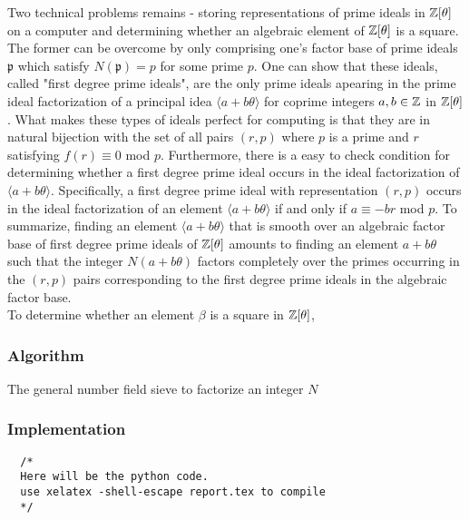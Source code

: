     Two technical problems remains - storing representations of prime ideals in $\mathbb{Z}[\theta]$ on a computer and determining whether an algebraic element of $\mathbb{Z}[\theta]$ is a square. \\ 

    The former can be overcome by only comprising one's factor base of prime ideals $\mathfrak{p}$ which satisfy $N(\mathfrak{p})=p$ for some prime $p$. One can show that these ideals, called "first degree prime ideals", are the only prime ideals apearing in the prime ideal factorization of a principal idea $\langle a + b \theta \rangle $ for coprime integers $a,b\in \mathbb{Z}$ in $\mathbb{Z}[\theta]$. What makes these types of ideals perfect for computing is that they are in natural bijection with the set of all pairs $(r,p)$ where $p$ is a prime and $r$ satisfying $f(r) \equiv 0$ mod $p$. Furthermore, there is a easy to check condition for determining whether a first degree prime ideal occurs in the ideal factorization of $\langle a + b \theta \rangle $. Specifically, a first degree prime ideal with representation $(r,p)$ occurs in the ideal factorization of an element $\langle a + b \theta \rangle $ if and only if $a \equiv -br $ mod $p$. To summarize, finding an element $\langle a + b \theta \rangle $ that is smooth over an algebraic factor base of first degree prime ideals of $\mathbb{Z}[\theta]$ amounts to finding an element $a + b \theta $ such that the integer $N(a + b \theta)$ factors completely over the primes occurring in the $(r,p)$ pairs corresponding to the first degree prime ideals in the algebraic factor base. \\

    To determine whether an element $\beta$ is a square in $\mathbb{Z}[\theta]$, 


\subsubsection{Algorithm} \label{algo}

 
\begin{algorithm} 
  \caption{The general number field sieve to factorize an integer $N$}
  \begin{algorithmic}[1]
    \State {}
  \end{algorithmic} 
\end{algorithm} 

\subsubsection{Implementation}


\begin{verbatim}
  /*
  Here will be the python code.
  use xelatex -shell-escape report.tex to compile 
  */

\end{verbatim}



